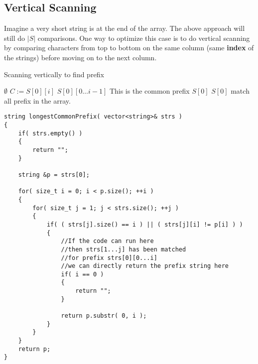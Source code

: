 \subsection{Vertical Scanning}
Imagine a very short string is at the end of the array. The above approach will still do $\lvert S\rvert$ comparisons. One way to optimize this case is to do vertical scanning by comparing characters from top to bottom on the same column (same \textbf{\color{red}index} of the strings) before moving on to the next column.
\begin{algorithm}[H]
\caption{Scanning vertically to find prefix}
\begin{algorithmic}[1]
\State \Return $\emptyset$
\EndIf
{} 
\State $C := S[0][i]$ 
\State \Return $S[0][0\ldots i-1]$ \Comment This is the common prefix
\EndIf
\EndFor
\EndFor
\State \Return $S[0]$ \Comment $S[0]$ match all prefix in the array.
\EndProcedure
\end{algorithmic}
\end{algorithm}
\begin{lstlisting}[style=customc, caption={Vertical Scanning}]
string longestCommonPrefix( vector<string>& strs )
{
    if( strs.empty() )
    {
        return "";
    }

    string &p = strs[0];

    for( size_t i = 0; i < p.size(); ++i )
    {
        for( size_t j = 1; j < strs.size(); ++j )
        {
            if( ( strs[j].size() == i ) || ( strs[j][i] != p[i] ) )
            {
                //If the code can run here
                //then strs[1...j] has been matched
                //for prefix strs[0][0...i]
                //we can directly return the prefix string here
                if( i == 0 )
                {
                    return "";
                }

                return p.substr( 0, i );
            }
        }
    }
    return p;
}
\end{lstlisting}
